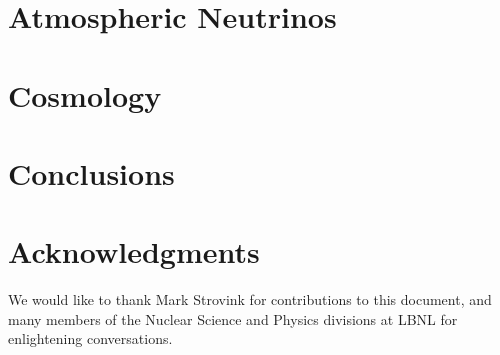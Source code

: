 \documentclass[12pt,letterpaper,amsmath,amssymb,final]{article}
\begin{document}
\section{Atmospheric Neutrinos}\label{s:atm}



\section{Cosmology }\label{s:cosmo}


\section{Conclusions}




\section{Acknowledgments}
We would like to thank Mark Strovink for contributions to this document, and many members of the Nuclear Science and Physics divisions at LBNL for enlightening conversations.

\newpage

\begin{thebibliography}{1}

\end{thebibliography}
\end{document}
